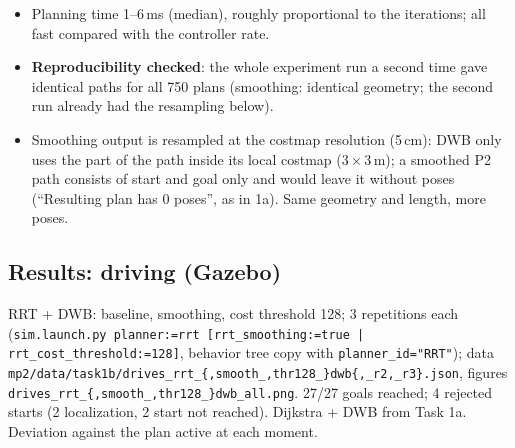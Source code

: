 \documentclass[10pt]{article}
\newcommand{\pkg}[1]{\texttt{#1}}
\begin{document}
\begin{itemize}
        straight segments through the pillar field. Success rate unchanged (smoothing does not help to find a path).
  \item Planning time 1--6\,ms (median), roughly proportional to the iterations; all fast compared with the controller rate.
  \item \textbf{Reproducibility checked}: the whole experiment run a second time gave identical paths for all
        750 plans (smoothing: identical geometry; the second run already had the resampling below).
  \item Smoothing output is resampled at the costmap resolution (5\,cm): DWB only uses the part of the path inside
        its local costmap ($3\times3$\,m); a smoothed P2 path consists of start and goal only and would leave it
        without poses (``Resulting plan has 0 poses'', as in 1a). Same geometry and length, more poses.
\end{itemize}

\subsection{Results: driving (Gazebo)}
RRT + DWB: baseline, smoothing, cost threshold 128; 3 repetitions each (\pkg{sim.launch.py planner:=rrt
[rrt\_smoothing:=true | rrt\_cost\_threshold:=128]}, behavior tree copy with \pkg{planner\_id="RRT"}); data
\pkg{mp2/data/task1b/drives\_rrt\_\{,smooth\_,thr128\_\}dwb\{,\_r2,\_r3\}.json}, figures
\pkg{drives\_rrt\_\{,smooth\_,thr128\_\}dwb\_all.png}. 27/27 goals reached; 4 rejected starts (2 localization, 2 start
not reached). Dijkstra + DWB from Task 1a. Deviation against the plan active at each moment.
\end{document}
